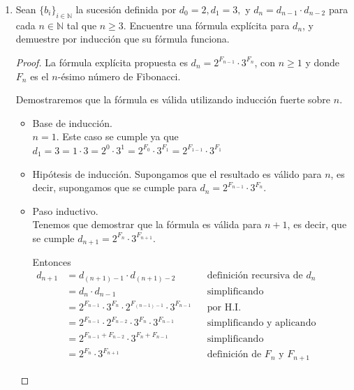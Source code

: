 \documentclass[letterpaper,11pt]{article}
\begin{document}
\begin{enumerate}
    \item Sean $\{b_{i}\}_{i \in ℕ}$ la sucesión definida por $d_{0} = 2, 
    d_{1} = 3, $ y $d_{n} = d_{n-1} \cdot d_{n-2}$ para cada $n \in ℕ$ tal que 
    $n \geq 3$. Encuentre una fórmula explícita para $d_{n}$, y demuestre por 
    inducción que su fórmula funciona.

    \begin{proof}
        La fórmula explícita propuesta es $d_{n} = 2^{F_{n-1}} ⋅ 3^{F_{n}}$, con 
        $n \geq 1$ y donde $F_{n}$ es el $n$-ésimo número de Fibonacci.

        Demostraremos que la fórmula es válida utilizando inducción fuerte sobre 
        $n$.
        \begin{itemize}
            \item Base de inducción. \\
            $n = 1$. Este caso se cumple ya que $d_{1} = 3 = 1 ⋅ 3 = 
            2^{0} ⋅ 3^{1} = 2^{F_{0}} ⋅ 3 ^{F_{1}} = 2^{F_{1-1}} ⋅ 3^{F_{1}}$ 

            \item Hipótesis de inducción. Supongamos que el resultado es válido 
            para $n$, es decir, supongamos que se cumple para 
            $d_{n} = 2^{F_{n-1}} ⋅ 3^{F_{n}}$.

            \item Paso inductivo. \\
            Tenemos que demostrar que la fórmula es válida para $n + 1$, es 
            decir, que se cumple $d_{n+1} = 2^{F_{n}} ⋅ 3^{F_{n+1}}$.

            Entonces 
            \begin{align*}
                d_{n+1} 
                &= d_{(n+1)-1} ⋅ d_{(n+1)-2}
                && \text{definición recursiva de $d_{n}$} \\ 
                &= d_{n} ⋅ d_{n-1}
                && \text{simplificando} \\ 
                &= 2^{F_{n-1}} ⋅ 3^{F_{n}} ⋅ 2^{F_{(n-1)-1}} ⋅ 3^{F_{n-1}}
                && \text{por H.I.} \\ 
                &= 2^{F_{n-1}} ⋅ 2^{F_{n-2}} ⋅ 3^{F_{n}} ⋅ 3^{F_{n-1}}
                && \text{simplificando y aplicando conmutatividad} \\ 
                &= 2^{F_{n-1} + F_{n-2}} ⋅ 3^{F_{n} + F_{n-1}}
                && \text{simplificando} \\ 
                &= 2^{F_{n}} ⋅ 3^{F_{n+1}}
                && \text{definición de $F_{n}$ y $F_{n+1}$}
            \end{align*}
        \end{itemize}
    \end{proof}


\end{enumerate}
\end{document}
